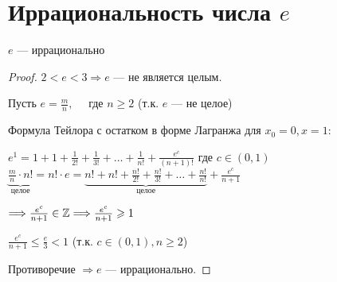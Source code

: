 \section{Иррациональность числа $e$ \href{https://youtu.be/au9-34CerJM?t=7867}{\Walley}}

\begin{theorem-non}
    $e$ --- иррационально    

    \begin{proof}
        $2 < e < 3 \Longrightarrow e$ --- не является целым.
        
        Пусть $e = \frac{m}{n}, \quad$ где $n \geqslant 2$ (т.к. $e$ --- не целое)
        
        Формула Тейлора с остатком в форме Лагранжа для $x_0 = 0, x = 1:$
        \begin{center}
            $e^1 = 1 + 1 + \frac{1}{2!} + \frac{1}{3!} + \dots + \frac{1}{n!} + \frac{e^c}{(n+1)!}$ где $c \in (0,1)$ \\
            $\underbrace{\frac{m}{n} \cdot n!}_{\text{целое}} = n! \cdot e = 
            \underbrace{n! + n! + \frac{n!}{2!} + \frac{n!}{3!} + \dots + \frac{n!}{n!}}_{\text{целое}} + \frac{e^c}{n+1}$

            $\Longrightarrow \frac{e^c}{n+1} \in \mathbb{Z} \Longrightarrow \frac{e^c}{n+1} \geqslant 1$ 

            $\frac{e^c}{n + 1} \leqslant \frac{e}{3} < 1$ (т.к. $c \in (0,1), n \geqslant 2$) 
        \end{center}
        Противоречие $\Longrightarrow e$ --- иррационально. 

    \end{proof}

\end{theorem-non}